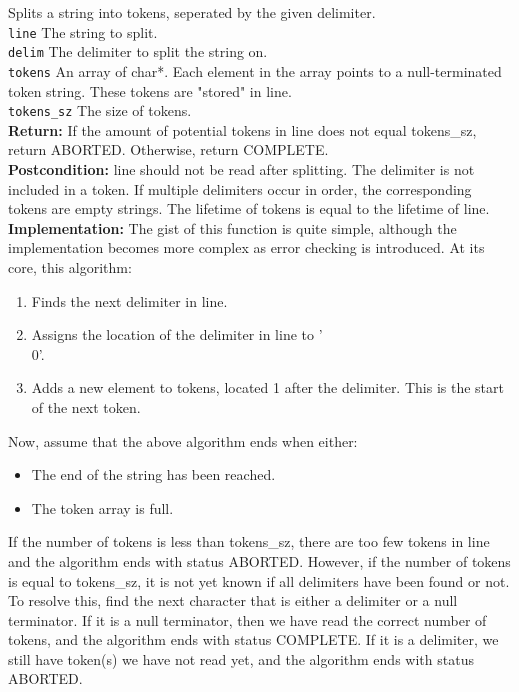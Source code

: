 \documentclass{article}
\begin{document}
  Splits a string into tokens, seperated by the given delimiter.\\ 
 \texttt{line} The string to split.\\ 
 \texttt{delim} The delimiter to split the string on.\\ 
 \texttt{tokens} An array of char*.
     Each element in the array points to a null-terminated token string.
     These tokens are "stored" in  line.\\ 
 \texttt{tokens\_sz} The size of  tokens.\\ 
 \textbf{Return:} If the amount of potential tokens in  line does not equal
      tokens\_sz, return ABORTED. Otherwise, return COMPLETE.\\ 
 \textbf{Postcondition:}  line should not be read after splitting.
  The delimiter is not included in a token.
     If multiple delimiters occur in order,
         the corresponding tokens are empty strings.
     The lifetime of  tokens is equal to the lifetime of  line.\\ 
 
 
 \textbf{Implementation:}
The gist of this function is quite simple, although the implementation
becomes more complex as error checking is introduced.
At its core, this algorithm:
\begin{enumerate}
 \item Finds the next delimiter in  line.
 \item Assigns the location of the delimiter in  line to '\\0'.
 \item Adds a new element to  tokens, located 1 after the delimiter.
         This is the start of the next token.
\end{enumerate}

Now, assume that the above algorithm ends when either:
\begin{itemize}
 \item The end of the string has been reached.
 \item The token array is full.
\end{itemize}

If the number of tokens is less than tokens\_sz, there are too few tokens
in  line and the algorithm ends with status ABORTED.
However, if the number of tokens is equal to tokens\_sz, it is not yet known
     if all delimiters have been found or not. To resolve this, find the next
     character that is either a delimiter or a null terminator.
If it is a null terminator, then we have read the correct number of tokens,
 and the algorithm ends with status COMPLETE.
If it is a delimiter, we still have token(s) we have not read yet,
 and the algorithm ends with status ABORTED.
 
\end{document}
